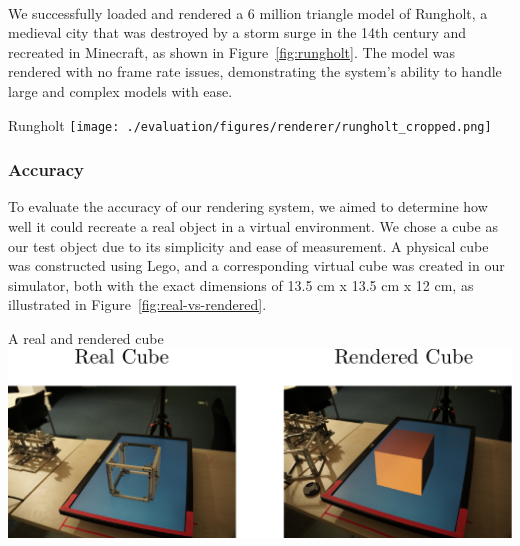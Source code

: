 \begin{invisBox}  
	\hfill
	\\[0.3cm]
	\hfill
\end{invisBox}

We successfully loaded and rendered a 6 million triangle model of Rungholt, a medieval city that was destroyed by a storm surge in the 14th century and recreated in Minecraft, as shown in Figure~\ref{fig:rungholt}. The model was rendered with no frame rate issues, demonstrating the system's ability to handle large and complex models with ease.

\begin{figureBox}[label={fig:rungholt}, width=1.0\linewidth]{Rungholt \cite{McGuire2017Data}}
	\texttt{[image: ./evaluation/figures/renderer/rungholt\_cropped.png]}
\end{figureBox}

\subsubsection{Accuracy}

To evaluate the accuracy of our rendering system, we aimed to determine how well it could recreate a real object in a virtual environment. We chose a cube as our test object due to its simplicity and ease of measurement. A physical cube was constructed using Lego, and a corresponding virtual cube was created in our simulator, both with the exact dimensions of 13.5 cm x 13.5 cm x 12 cm, as illustrated in Figure~\ref{fig:real-vs-rendered}.

\begin{figureBox}[label={fig:real-vs-rendered}, width=1.0\linewidth]{A real and rendered cube}
	\includegraphics[width = 1.0\linewidth]{./evaluation/figures/real-vs-rendered.pdf}
\end{figureBox}

